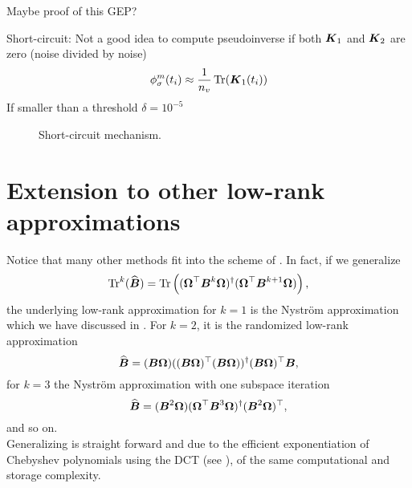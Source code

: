 Maybe proof of this GEP?

Short-circuit: Not a good idea to compute pseudoinverse if
both $\boldsymbol{K}_1$ and $\boldsymbol{K}_2$ are zero (noise divided by noise)
\begin{equation}
    \phi_{\sigma}^m(t_i) \approx \frac{1}{n_v} \operatorname{Tr}(\boldsymbol{K}_1(t_i))
    \label{equ:3-nystrom-shortcircuit-hutchinson}
\end{equation}
If smaller than a threshold $\delta = 10^{-5}$

\begin{figure}[ht]
    \centering
    
    \caption{Short-circuit mechanism.}
    \label{fig:3-nystrom-short-circuit-mechanism}
\end{figure}


\section{Extension to other low-rank approximations}
\label{sec:3-nystrom-other-low-rank}

Notice that many other methods \cite{halko2011finding,tropp2023randomized} fit
into the scheme of . In fact, if we
generalize
\begin{equation}
    \operatorname{Tr}^{k}(\widehat{\boldsymbol{B}})
        = \operatorname{Tr}\left((\boldsymbol{\Omega}^{\top} \boldsymbol{B}^k \boldsymbol{\Omega})^{\dagger} (\boldsymbol{\Omega}^{\top} \boldsymbol{B}^{k+1} \boldsymbol{\Omega}) \right),
    \label{equ:3-nystrom-trace-generalization}
\end{equation}
the underlying low-rank approximation for $k=1$ is the Nystr\"om approximation
which we have discussed in .
For $k=2$, it is the randomized low-rank approximation \cite{halko2011finding, tropp2023randomized}
\begin{equation}
    \widehat{\boldsymbol{B}} = (\boldsymbol{B} \boldsymbol{\Omega}) ((\boldsymbol{B} \boldsymbol{\Omega})^{\top} (\boldsymbol{B} \boldsymbol{\Omega}))^{\dagger} (\boldsymbol{B} \boldsymbol{\Omega})^{\top} \boldsymbol{B},
    \label{equ:3-nystrom-RSVD}
\end{equation}
for $k=3$ the Nystr\"om approximation with one subspace iteration \cite{tropp2023randomized}
\begin{equation}
    \widehat{\boldsymbol{B}} = (\boldsymbol{B}^2 \boldsymbol{\Omega}) (\boldsymbol{\Omega}^{\top} \boldsymbol{B}^3 \boldsymbol{\Omega})^{\dagger} (\boldsymbol{B}^2 \boldsymbol{\Omega})^{\top},
    \label{equ:3-nystrom-nystrom-SI}
\end{equation}
and so on.\\

Generalizing  is straight forward and
due to the efficient exponentiation of Chebyshev polynomials using the \gls{DCT}
(see ), of the same
computational and storage complexity.
